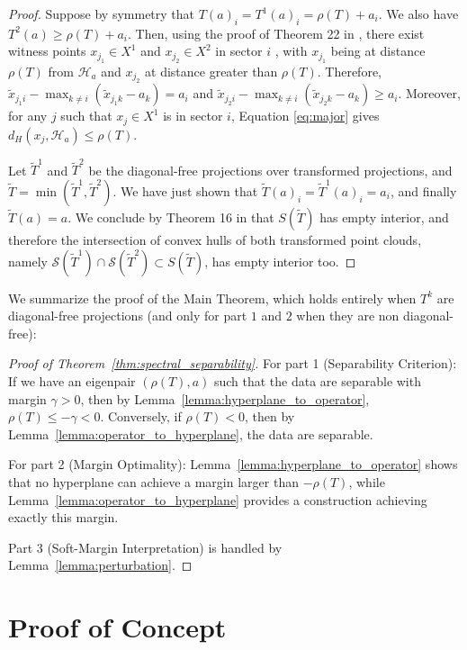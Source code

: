 \documentclass{article}
\renewcommand{\leq}{\leqslant}
\begin{document}
\begin{proof}
Suppose by symmetry that $T(a)_{i}=T^{1}(a)_{i}=\rho(T)+a_{i}$. We
also have $T^{2}(a)\ge\rho(T)+a_{i}$. Then, using the proof of Theorem
22 in \cite{akiangaubertqisaadi}, there exist witness points $x_{j_{1}}\in X^{1}$ and
$x_{j_{2}}\in X^{2}$ in sector $i$ , with $x_{j_{1}}$ being at
distance $\rho(T)$ from $\mathcal{H}_{a}$ and $x_{j_{2}}$ at distance
greater than $\rho(T)$. Therefore, $\tilde{x}_{j_{1}i}-\max_{k\ne i}(\tilde{x}_{j_{1}k}-a_{k})=a_{i}$
and $\tilde{x}_{j_{2}i}-\max_{k\ne i}(\tilde{x}_{j_{2}k}-a_{k})\ge a_{i}$.
Moreover, for any $j$ such that $x_{j}\in X^1$ is in sector $i$,
Equation \ref{eq:major} gives $d_{H}(x_{j},\mathcal{H}_{a})\le\rho(T)$.

Let $\tilde{T}^{1}$ and $\tilde{T}^{2}$ be the diagonal-free projections
over transformed projections, and $\tilde{T}=\min(\tilde{T}^{1},\tilde{T}^{2})$.
We have just shown that $\tilde{T}(a)_{i}=\tilde{T}^{1}(a)_{i}=a_{i}$,
  and finally $\tilde{T}(a)=a$. We conclude by Theorem 16 in \cite{allamigeon_condition} that $S(\tilde{T})$ has empty interior, and therefore the intersection of convex hulls of both transformed point clouds, namely $\mathcal{S}(\tilde{T}^1) \cap \mathcal{S}(\tilde{T}^2) \subset S(\tilde{T})$, has empty interior too.
\end{proof}

We summarize the proof of the Main Theorem, which holds entirely when $T^k$ are diagonal-free projections (and only for part $1$ and $2$ when they are non diagonal-free):

\begin{proof}[Proof of Theorem~\ref{thm:spectral_separability}]
For part 1 (Separability Criterion): If we have an eigenpair $(\rho(T),a)$ such that the data are separable with margin $\gamma > 0$, then by Lemma~\ref{lemma:hyperplane_to_operator}, $\rho(T) \leq -\gamma < 0$. Conversely, if $\rho(T) < 0$, then by Lemma~\ref{lemma:operator_to_hyperplane}, the data are separable.

For part 2 (Margin Optimality): Lemma~\ref{lemma:hyperplane_to_operator} shows that no hyperplane can achieve a margin larger than $-\rho(T)$, while Lemma~\ref{lemma:operator_to_hyperplane} provides a construction achieving exactly this margin.

Part 3 (Soft-Margin Interpretation) is handled by Lemma~\ref{lemma:perturbation}.
\end{proof}

\section{Proof of Concept}\label{appendix:empirical}
\end{document}
